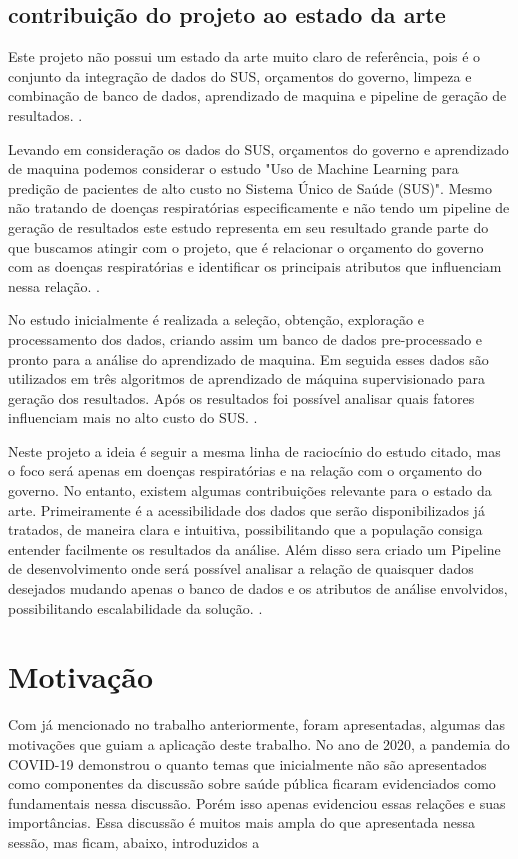 \documentclass[journal]{IEEEtran}
\begin{document}
\subsection{contribuição do projeto ao estado da arte}
Este projeto não possui um estado da arte muito claro de referência, pois é o conjunto da integração de dados do SUS, orçamentos do governo, limpeza e combinação de banco de dados, aprendizado de maquina e pipeline de geração de resultados. \cite{estado_arte}.

Levando em consideração os dados do SUS, orçamentos do governo e aprendizado de maquina podemos considerar o estudo "Uso de Machine Learning para predição de pacientes de alto custo no Sistema Único de Saúde (SUS)". Mesmo não tratando de doenças respiratórias especificamente e não tendo um pipeline de geração de resultados este estudo representa em seu resultado grande parte do que buscamos atingir com o projeto, que é relacionar o orçamento do governo com as doenças respiratórias e identificar os principais atributos que influenciam nessa relação. \cite{estado_arte}.

No estudo inicialmente é realizada a seleção, obtenção, exploração e processamento dos dados, criando assim um banco de dados pre-processado e pronto para a análise do aprendizado de maquina. Em seguida esses dados são utilizados em três algoritmos de aprendizado de máquina supervisionado para geração dos resultados. Após os resultados foi possível analisar quais fatores influenciam mais no alto custo do SUS.   \cite{estado_arte}.

Neste projeto a ideia é seguir a mesma linha de raciocínio do estudo citado, mas o foco será apenas em doenças respiratórias e na relação com o orçamento do governo. No entanto, existem algumas contribuições relevante para o estado da arte. Primeiramente é a acessibilidade dos dados que serão disponibilizados já tratados, de maneira clara e intuitiva, possibilitando que a população consiga entender facilmente os resultados da análise. Além disso sera criado um Pipeline de desenvolvimento onde será possível analisar a relação de quaisquer dados desejados mudando apenas o banco de dados e os atributos de análise envolvidos, possibilitando escalabilidade da solução.  \cite{estado_arte}.

\section{Motivação} 
Com já mencionado no trabalho anteriormente, foram apresentadas, algumas das motivações que guiam a aplicação deste trabalho. 
No ano de 2020, a pandemia do COVID-19 demonstrou o quanto temas que inicialmente não são apresentados como componentes da discussão sobre saúde pública ficaram evidenciados como fundamentais nessa discussão. Porém isso apenas evidenciou essas relações e suas importâncias. Essa discussão é muitos mais ampla do que apresentada nessa sessão, mas ficam, abaixo, introduzidos a
\end{document}
